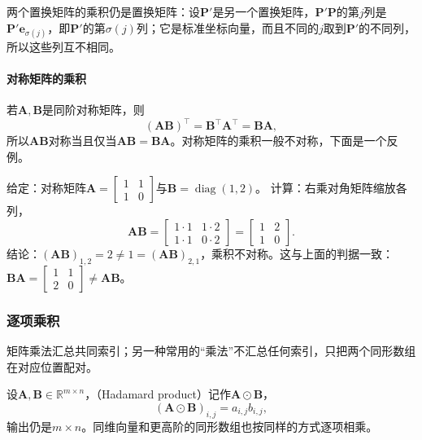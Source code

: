 两个置换矩阵的乘积仍是置换矩阵：设$\bm P'$是另一个置换矩阵，$\bm P'\bm P$的第$j$列是$\bm P'\bm e_{\sigma(j)}$，即$\bm P'$的第$\sigma(j)$列；它是标准坐标向量，而且不同的$j$取到$\bm P'$的不同列，所以这些列互不相同。

\paragraph{对称矩阵的乘积}
若$\bm A,\bm B$是同阶对称矩阵，则
\[
 (\bm A\bm B)^\top=\bm B^\top\bm A^\top=\bm B\bm A,
\]
所以$\bm A\bm B$对称当且仅当$\bm A\bm B=\bm B\bm A$。对称矩阵的乘积一般不对称，下面是一个反例。
\begin{example}[反例：两个对称矩阵的乘积不对称]
\label{ex:ls-symmetric-product-not-symmetric}
给定：对称矩阵$\bm A=\left[\begin{smallmatrix}1&1\\1&0\end{smallmatrix}\right]$与$\bm B=\operatorname{diag}(1,2)$。
计算：右乘对角矩阵缩放各列，
\[
 \bm A\bm B=\begin{bmatrix}1\cdot1&1\cdot2\\1\cdot1&0\cdot2\end{bmatrix}=\begin{bmatrix}1&2\\1&0\end{bmatrix}.
\]
结论：$(\bm A\bm B)_{1,2}=2\neq1=(\bm A\bm B)_{2,1}$，乘积不对称。这与上面的判据一致：$\bm B\bm A=\left[\begin{smallmatrix}1&1\\2&0\end{smallmatrix}\right]\neq\bm A\bm B$。
\end{example}


\subsubsection{逐项乘积}
\label{sec:ls-hadamard-product}

矩阵乘法汇总共同索引；另一种常用的“乘法”不汇总任何索引，只把两个同形数组在对应位置配对。

设$\bm A,\bm B\in\mathbb R^{m\times n}$，（Hadamard product）记作$\bm A\odot\bm B$，
\begin{equation}
 (\bm A\odot\bm B)_{i,j}=a_{i,j}b_{i,j},
 \label{eq:ls-hadamard}
\end{equation}
输出仍是$m\times n$。同维向量和更高阶的同形数组也按同样的方式逐项相乘。

